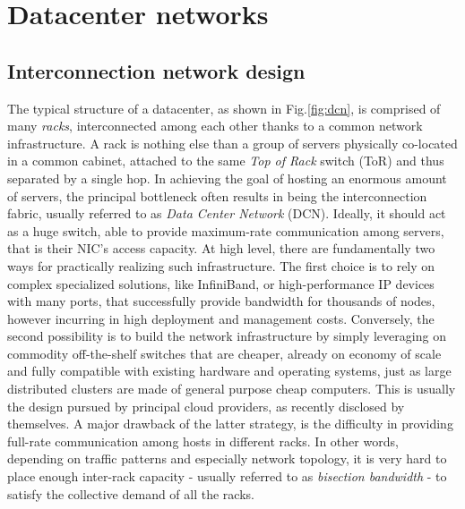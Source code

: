 \chapter{Datacenter networks}
\label{ch1}
\section{Interconnection network design}
\label{sec:topology}
The typical structure of a datacenter, as shown in Fig.\ref{fig:dcn},  
is comprised of many \textit{racks}, interconnected among each other thanks to a common network infrastructure. A rack is nothing else than a group of servers physically co-located in a common cabinet, attached to the same \textit{Top of Rack} switch (ToR) and thus  separated by a single hop. In achieving the goal of hosting an enormous amount of servers, the principal bottleneck often results in being the interconnection fabric, usually referred to as \textit{Data Center Network} (DCN). Ideally, it should act as a huge switch, able to provide maximum-rate communication among servers, that is their NIC's access capacity.  At high level, there are fundamentally two ways for practically realizing such infrastructure. The first choice is to rely on complex specialized solutions, like InfiniBand, or high-performance IP devices with many ports, that successfully provide bandwidth for thousands of nodes, however incurring in high deployment and management costs. Conversely, the second possibility is to build the network infrastructure by simply leveraging on commodity off-the-shelf switches that are cheaper, already on economy of scale and fully compatible with existing hardware and operating systems, just as large distributed clusters are made of general purpose cheap computers. This is usually the design pursued by principal cloud providers, as recently disclosed by themselves. A major drawback of the latter strategy, is the difficulty in providing full-rate communication among hosts in different racks. In other words, depending on traffic patterns and especially network topology, it is very hard to place enough inter-rack capacity - usually referred to as \textit{bisection bandwidth} - to satisfy the collective demand of all the racks. 
